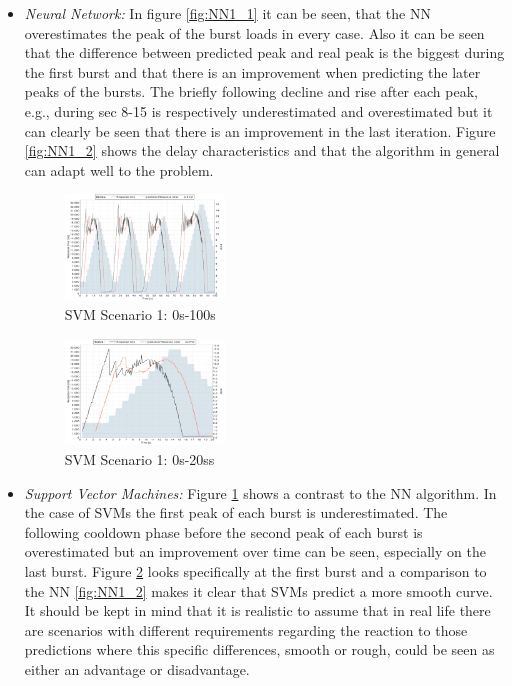 \begin{itemize}
\item \textit{Neural Network:} In figure \ref*{fig:NN1_1} it can be seen, that the NN overestimates the peak of the burst loads in every case. Also it can be seen that the difference between predicted peak and real peak is the biggest during the first burst and that there is an improvement when predicting the later peaks of the bursts. The briefly following decline and rise after each peak, e.g., during sec 8-15 is respectively underestimated and overestimated but it can clearly be seen that there is an improvement in the last iteration. Figure \ref*{fig:NN1_2} shows the delay characteristics and that the algorithm in general can adapt well to the problem. 


\begin{figure}[ht]
	\begin{center}
		\includegraphics[width=0.40\textwidth]{chapters/chapter5/fig/SVM1_1}
	\end{center}
	\caption{SVM Scenario 1: 0s-100s}
	\label{fig:SVM1_1}
\end{figure}

\begin{figure}[ht]
	\begin{center}
		\includegraphics[width=0.40\textwidth]{chapters/chapter5/fig/SVM1_2}
	\end{center}
	\caption{SVM Scenario 1: 0s-20ss}
	\label{fig:SVM1_2}
\end{figure}

\item \textit{Support Vector Machines:} Figure \ref*{fig:SVM1_1} shows a contrast to the NN algorithm. In the case of SVMs the first peak of each burst is underestimated. The following cooldown phase before the second peak of each burst is overestimated but an improvement over time can be seen, especially on the last burst. Figure \ref{fig:SVM1_2} looks specifically at the first burst and a comparison to the NN \ref*{fig:NN1_2} makes it clear that SVMs predict a more smooth curve. It should be kept in mind that it is realistic to assume that in real life there are scenarios with different requirements regarding the reaction to those predictions where this specific differences, smooth or rough, could be seen as either an advantage or disadvantage.



\end{itemize}
